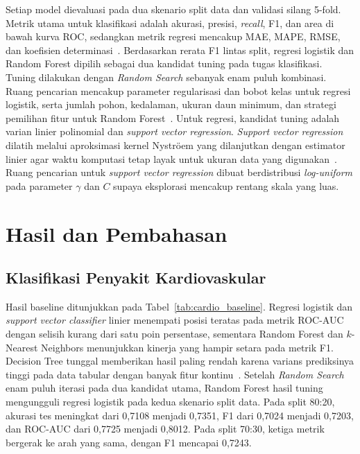 \documentclass[conference]{IEEEtran}
\begin{document}
Setiap model dievaluasi pada dua skenario split data dan validasi silang 5-fold. Metrik utama untuk klasifikasi adalah akurasi, presisi, \textit{recall}, F1, dan area di bawah kurva ROC, sedangkan metrik regresi mencakup MAE, MAPE, RMSE, dan koefisien determinasi~\cite{Naser2023}. Berdasarkan rerata F1 lintas split, regresi logistik dan Random Forest dipilih sebagai dua kandidat tuning pada tugas klasifikasi. Tuning dilakukan dengan \textit{Random Search} sebanyak enam puluh kombinasi. Ruang pencarian mencakup parameter regularisasi dan bobot kelas untuk regresi logistik, serta jumlah pohon, kedalaman, ukuran daun minimum, dan strategi pemilihan fitur untuk Random Forest~\cite{Yang2020Hyperopt}. Untuk regresi, kandidat tuning adalah varian linier polinomial dan \textit{support vector regression}. \textit{Support vector regression} dilatih melalui aproksimasi kernel Nystr\"oem yang dilanjutkan dengan estimator linier agar waktu komputasi tetap layak untuk ukuran data yang digunakan~\cite{Pedregosa2011}. Ruang pencarian untuk \textit{support vector regression} dibuat berdistribusi \textit{log-uniform} pada parameter $\gamma$ dan $C$ supaya eksplorasi mencakup rentang skala yang luas.

\section{Hasil dan Pembahasan}

\subsection{Klasifikasi Penyakit Kardiovaskular}
Hasil baseline ditunjukkan pada Tabel~\ref{tab:cardio_baseline}. Regresi logistik dan \textit{support vector classifier} linier menempati posisi teratas pada metrik ROC-AUC dengan selisih kurang dari satu poin persentase, sementara Random Forest dan $k$-Nearest Neighbors menunjukkan kinerja yang hampir setara pada metrik F1. Decision Tree tunggal memberikan hasil paling rendah karena varians prediksinya tinggi pada data tabular dengan banyak fitur kontinu~\cite{Hastie2009}. Setelah \textit{Random Search} enam puluh iterasi pada dua kandidat utama, Random Forest hasil tuning mengungguli regresi logistik pada kedua skenario split data. Pada split 80:20, akurasi tes meningkat dari 0{,}7108 menjadi 0{,}7351, F1 dari 0{,}7024 menjadi 0{,}7203, dan ROC-AUC dari 0{,}7725 menjadi 0{,}8012. Pada split 70:30, ketiga metrik bergerak ke arah yang sama, dengan F1 mencapai 0{,}7243.
\end{document}
